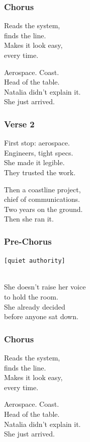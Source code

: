 \subsubsection{Chorus}\label{chorus-55}

Reads the system,\\
finds the line.\\
Makes it look easy,\\
every time.

Aerospace. Coast.\\
Head of the table.\\
Natalia didn't explain it.\\
She just arrived.

\subsubsection{Verse 2}\label{verse-2-17}

First stop: aerospace.\\
Engineers, tight specs.\\
She made it legible.\\
They trusted the work.

Then a coastline project,\\
chief of communications.\\
Two years on the ground.\\
Then she ran it.

\subsubsection{Pre-Chorus}\label{pre-chorus-42}

\texttt{{[}quiet\ authority{]}}\strut \\
She doesn't raise her voice\\
to hold the room.\\
She already decided\\
before anyone sat down.

\subsubsection{Chorus}\label{chorus-56}

Reads the system,\\
finds the line.\\
Makes it look easy,\\
every time.

Aerospace. Coast.\\
Head of the table.\\
Natalia didn't explain it.\\
She just arrived.

